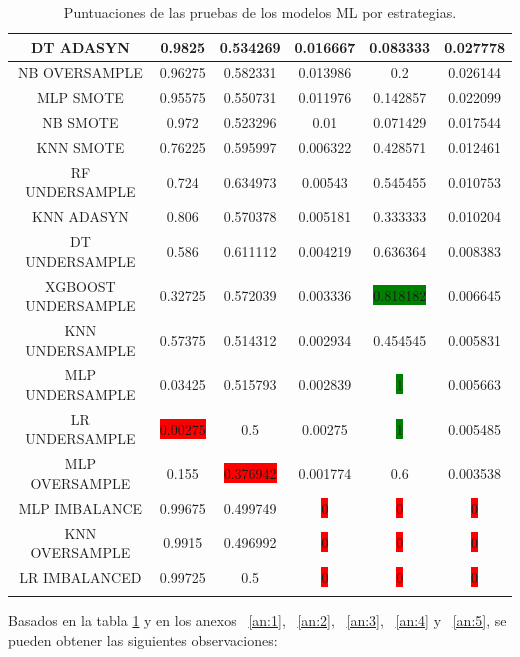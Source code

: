 \begin{longtable}{|c|c|c|c|c|c|}
  	DT ADASYN & 0.9825 & 0.534269 & 0.016667 & 0.083333 & 0.027778\\ \hline
  	NB OVERSAMPLE & 0.96275 & 0.582331 & 0.013986 & 0.2 & 0.026144\\ \hline
  	MLP SMOTE & 0.95575 & 0.550731 & 0.011976 & 0.142857 & 0.022099\\ \hline
  	NB SMOTE & 0.972 & 0.523296 & 0.01 & 0.071429 & 0.017544\\ \hline
  	KNN SMOTE & 0.76225 & 0.595997 & 0.006322 & 0.428571 & 0.012461\\ \hline
  	RF UNDERSAMPLE & 0.724 & 0.634973 & 0.00543 & 0.545455 & 0.010753\\ \hline
  	KNN ADASYN & 0.806 & 0.570378 & 0.005181 & 0.333333 & 0.010204\\ \hline
  	DT UNDERSAMPLE & 0.586 & 0.611112 & 0.004219 & 0.636364 & 0.008383\\ \hline
  	XGBOOST UNDERSAMPLE & 0.32725 & 0.572039 & 0.003336 & \colorbox{green}{0.818182} & 0.006645\\ \hline
  	KNN UNDERSAMPLE & 0.57375 & 0.514312 & 0.002934 & 0.454545 & 0.005831\\ \hline
  	MLP UNDERSAMPLE & 0.03425 & 0.515793 & 0.002839 & \colorbox{green}{1} & 0.005663\\ \hline
  	LR UNDERSAMPLE & \colorbox{red}{0.00275} & 0.5 & 0.00275 & \colorbox{green}{1} & 0.005485\\ \hline
  	MLP OVERSAMPLE & 0.155 & \colorbox{red}{0.376942} & 0.001774 & 0.6 & 0.003538\\ \hline
  	MLP IMBALANCE & 0.99675 & 0.499749 & \colorbox{red}{0} & \colorbox{red}{0} & \colorbox{red}{0}\\ \hline
  	KNN OVERSAMPLE & 0.9915 & 0.496992 & \colorbox{red}{0} & \colorbox{red}{0} & \colorbox{red}{0}\\ \hline
  	LR IMBALANCED & 0.99725 & 0.5 & \colorbox{red}{0} & \colorbox{red}{0} & \colorbox{red}{0}\\ \hline
  	\caption{Puntuaciones de las pruebas de los modelos ML por estrategias.}
  	\label{t:2}
  \end{longtable}

Basados en la tabla \ref{t:2} y en los anexos ~\ref{an:1}, ~\ref{an:2}, ~\ref{an:3}, ~\ref{an:4} y ~\ref{an:5}, se pueden obtener las siguientes observaciones:

